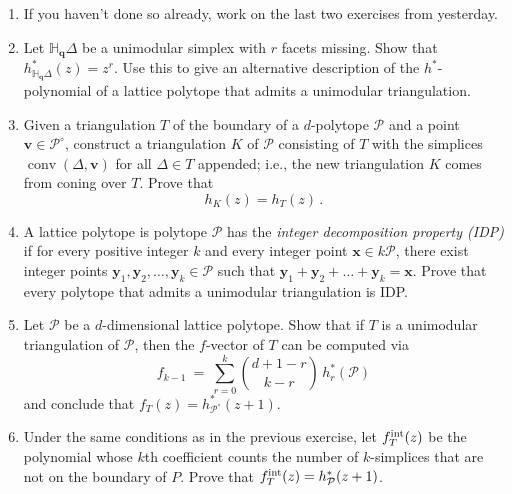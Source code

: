 \documentclass[11pt]{article}
\def\bq{\mathbf{q}}
\def\v{\mathbf{v}}
\def\x{\mathbf{x}}
\def\y{\mathbf{y}}
\def\cP{\mathcal{P}}
\def\hopen{\mathbb{H}}
\newcommand\conv{\operatorname{conv}}
\begin{document}
\begin{enumerate}[(1)]
\vspace{-10pt}

\item If you haven't done so already, work on the last two exercises from yesterday.

\item Let $\hopen_\bq \Delta$ be a unimodular simplex with $r$ facets missing. Show that
$h^*_{\hopen_\bq \Delta } (z) = z^r$.
Use this to give an alternative description of the $h^*$-polynomial of a lattice polytope
that admits a unimodular triangulation.

\item Given a triangulation $T$ of the boundary of a $d$-polytope $\cP$ and a point $\v \in \cP^\circ$, construct a
triangulation $K$ of $\cP$ consisting of $T$ with the simplices $\conv(\Delta, \v)$ for all $\Delta \in T$ appended; i.e., the new triangulation $K$ comes from coning over $T$. Prove that
\[
h_K(z) = h_T(z) \, .
\]

\item A lattice polytope is polytope $\cP$ has the \emph{integer decomposition property (IDP)} if for every positive integer $k$ and every integer
point $\x \in k \cP$, there exist integer points $\y_1,\y_2,\dots,\y_k \in \cP$ such that $\y_1+\y_2+\dots+\y_k=\x$. Prove that every
polytope that admits a unimodular triangulation is IDP.

\item  Let $\cP$ be a $d$-dimensional lattice polytope. Show that if $T$ is a
    unimodular triangulation of $\cP$, then the $f$-vector of $T$ can be computed via
    \[
        f_{k-1} \ = \ \sum_{r=0}^k \binom{d+1-r}{k-r} \, h^*_r(\cP) 
    \]
and conclude that $f_T(z) = h^*_{ \cP^\circ } (z+1)$.

\item Under the same conditions as in the previous exercise, let $f_T^{ \rm int } (z)$ be the
polynomial whose $k$th coefficient counts the number of $k$-simplices that are not on the
boundary of $P$. Prove that $f_T^{ \rm int } (z) = h_\cP^*(z+1)$.


\end{enumerate}
\end{document}

